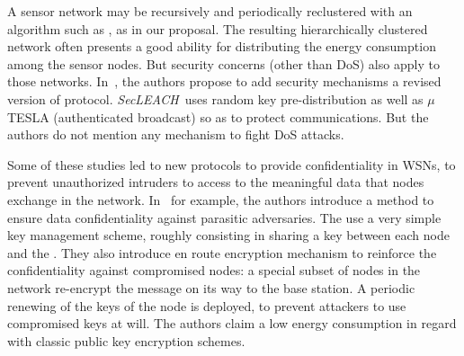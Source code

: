 
A sensor network may be recursively and periodically reclustered with an algorithm such as \leach, as in our proposal.
The resulting hierarchically clustered network often presents a good ability for distributing the energy consumption among the sensor nodes.
But security concerns (other than DoS) also apply to those networks.
In~\cite{OFVWBDL07}, the authors propose to add security mechanisms \via a revised version of \leach protocol.
\textit{SecLEACH}\ uses random key pre-distribution as well as $\mu$TESLA (authenticated broadcast) so as to protect communications.
But the authors do not mention any mechanism to fight DoS attacks.




Some of these studies led to new protocols to provide confidentiality in WSNs, \ie to prevent unauthorized intruders to access to the meaningful data that nodes exchange in the network.
In~\cite{LPH08} for example, the authors introduce a method to ensure data confidentiality against parasitic adversaries.
The use a very simple key management scheme, roughly consisting in sharing a key between each node and the \bs.
They also introduce en route encryption mechanism to reinforce the confidentiality against compromised nodes: a special subset of nodes in the network re-encrypt the message on its way to the base station.
A periodic renewing of the keys of the node is deployed, to prevent attackers to use compromised keys at will.
The authors claim a low energy consumption in regard with classic public key encryption schemes.












